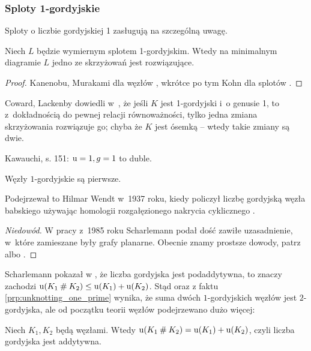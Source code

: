 
\subsubsection{Sploty 1-gordyjskie}
Sploty o liczbie gordyjskiej 1 zasługują na szczególną uwagę.

\begin{proposition}
%
    Niech $L$ będzie wymiernym splotem 1-gordyjskim.
    Wtedy na minimalnym diagramie $L$ jedno ze skrzyżowań jest rozwiązujące.
\end{proposition}

\begin{proof}
    Kanenobu, Murakami dla węzłów \cite{kanenobumurakami86}, wkrótce po tym Kohn dla splotów \cite{kohn91}.
\end{proof}

Coward, Lackenby dowiedli w~\cite{coward11}, że jeśli $K$ jest 1-gordyjski i~o genusie 1, to z~dokładnością do pewnej relacji równoważności, tylko jedna zmiana skrzyżowania rozwiązuje go; chyba że $K$ jest ósemką -- wtedy takie zmiany są dwie.

\begin{tobedone}
    Kawauchi, s. 151: $\operatorname{u} = 1, g = 1$ to duble.
\end{tobedone}

\begin{proposition}
\label{prp:unknotting_one_prime}%
    Węzły $1$-gordyjskie są pierwsze.
\end{proposition}

Podejrzewał to Hilmar Wendt w~1937 roku, kiedy policzył liczbę gordyjską węzła babskiego używając homologii rozgałęzionego nakrycia cyklicznego \cite{wendt37}.

\begin{proof}[Niedowód]
    W pracy \cite{scharlemann85} z~1985 roku Scharlemann podał dość zawiłe uzasadnienie, w~które zamieszane były grafy planarne.
    Obecnie znamy prostsze dowody, patrz \cite{lackenby97} albo \cite{zhang91}.
\end{proof}

Scharlemann pokazał w \cite[wniosek 1.6]{scharlemann98}, że liczba gordyjska jest podaddytywna, to znaczy zachodzi $\operatorname{u}(K_1 \mathbin{\#} K_2) \le \operatorname{u}(K_1) + \operatorname{u}(K_2)$.
Stąd oraz z faktu \ref{prp:unknotting_one_prime} wynika, że suma dwóch $1$-gordyjskich węzłów jest $2$-gordyjska, ale od początku teorii węzłów podejrzewano dużo więcej:

\begin{conjecture}
%
    Niech $K_1, K_2$ będą węzłami.
    Wtedy $\operatorname{u} (K_1 \mathbin{\#} K_2) = \operatorname{u}(K_1) + \operatorname{u}(K_2)$, czyli liczba gordyjska jest addytywna.
\end{conjecture}


